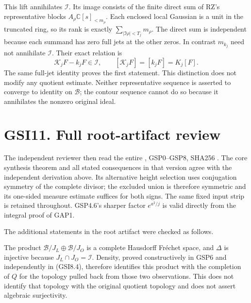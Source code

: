 This lift annihilates \(\mathcal I\). Its image consists of the finite
direct sum of RZ's representative blocks
\(A_\rho\mathbb C[s]_{<m_\rho}\). Each enclosed local Gaussian is a unit
in the truncated ring, so its rank is exactly
\(\sum_{|\Im\rho|<T_j}m_\rho\). The direct sum is independent because
each summand has zero full jets at the other zeros. In contrast
\(m_{k_j}\) need not annihilate \(\mathcal I\). Their exact relation is
\[
\mathscr K_jF-k_jF\in\mathcal I,
\qquad [\mathscr K_jF]=[k_jF]=K_j[F].
\tag{GSI10.3}
\] The same full-jet identity proves the first statement. This
distinction does not modify any quotient estimate. Neither
representative sequence is asserted to converge to identity on
\(\mathcal B\); the contour sequence cannot do so because it annihilates
the nonzero original ideal.

\section{GSI11. Full root-artifact
review}\label{gsi11.-full-root-artifact-review}

The independent reviewer then read the entire
\href{https://github.com/KokunoYumeto/zeta-function-research-reader/blob/main/workbenches/splitzero-tandem/continuations/20260925-full-source-tensor-and-original-divisor/gct/GAUSSIAN_SPECTRAL_SYNTHESIS.md}{},
GSP0--GSP8, SHA256
.
The core synthesis theorem and all stated consequences in that version
agree with the independent derivation above. Its alternative height
selection uses conjugation symmetry of the complete divisor; the
excluded union is therefore symmetric and its one-sided measure estimate
suffices for both signs. The same fixed input strip is retained
throughout. GSP4.6's sharper factor \(e^{a^2/j}\) is valid directly from
the integral proof of GAP1.

The additional statements in the root artifact were checked as follows.

The product \(\mathcal B/J_L\oplus\mathcal B/J_O\) is a complete
Hausdorff Fréchet space, and \(\Delta\) is injective because
\(J_L\cap J_O=\mathcal I\). Density, proved constructively in GSP6 and
independently in (GSI8.4), therefore identifies this product with the
completion of \(Q\) for the topology pulled back from those two
observations. This does not identify that topology with the original
quotient topology and does not assert algebraic surjectivity.

